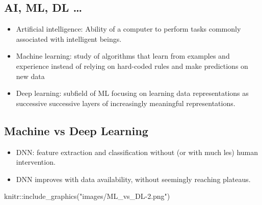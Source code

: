 \documentclass[
  letterpaper,
  DIV=11,
  numbers=noendperiod]{scrartcl}
\newenvironment{Shaded}{\begin{snugshade}}{\end{snugshade}}
\newcommand{\FunctionTok}[1]{\textcolor[rgb]{0.28,0.35,0.67}{#1}}
\newcommand{\NormalTok}[1]{\textcolor[rgb]{0.00,0.23,0.31}{#1}}
\newcommand{\SpecialCharTok}[1]{\textcolor[rgb]{0.37,0.37,0.37}{#1}}
\newcommand{\StringTok}[1]{\textcolor[rgb]{0.13,0.47,0.30}{#1}}
\providecommand{\tightlist}{%
  \setlength{\itemsep}{0pt}\setlength{\parskip}{0pt}}\usepackage{longtable,booktabs,array}
\begin{document}
\hypertarget{ai-ml-dl-1}{%
\subsection{AI, ML, DL \ldots{}}\label{ai-ml-dl-1}}

\begin{itemize}
\item
  Artificial intelligence: Ability of a computer to perform tasks
  commonly associated with intelligent beings.
\item
  Machine learning: study of algorithms that learn from examples and
  experience instead of relying on hard-coded rules and make predictions
  on new data
\item
  Deep learning: subfield of ML focusing on learning data
  representations as successive successive layers of increasingly
  meaningful representations.
\end{itemize}

\hypertarget{machine-vs-deep-learning}{%
\subsection{Machine vs Deep Learning}\label{machine-vs-deep-learning}}

\begin{itemize}
\tightlist
\item
  DNN: feature extraction and classification without (or with much les)
  human intervention.
\item
  DNN improves with data availability, without seemingly reaching
  plateaus.
\end{itemize}

\begin{Shaded}
\begin{Highlighting}[]
\NormalTok{knitr}\SpecialCharTok{::}\FunctionTok{include\_graphics}\NormalTok{(}\StringTok{"images/ML\_vs\_DL{-}2.png"}\NormalTok{)}
\end{Highlighting}
\end{Shaded}
\end{document}
